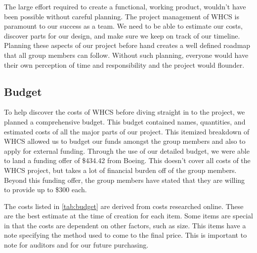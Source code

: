 The large effort required to create a functional, working product, wouldn't
have been possible without careful planning. The project management of WHCS is
paramount to our success as a team. We need to be able to estimate our costs,
discover parts for our design, and make sure we keep on track of our timeline.
Planning these aspects of our project before hand creates a well defined
roadmap that all group members can follow. Without such planning, everyone
would have their own perception of time and responsibility and the project
would flounder.

\subsection{Budget}
To help discover the costs of WHCS before diving straight in to the project, we
planned a comprehensive budget. This budget contained names, quantities, and
estimated costs of all the major parts of our project. This itemized breakdown
of WHCS allowed us to budget our funds amongst the group members and also to
apply for external funding. Through the use of our detailed budget, we were
able to land a funding offer of \$434.42 from Boeing. This doesn't cover all
costs of the WHCS project, but takes a lot of financial burden off of the group
members. Beyond this funding offer, the group members have stated that they are
willing to provide up to \$300 each.

The costs listed in \autoref{tab:budget} are derived from costs researched
online. These are the best estimate at the time of creation for each item. Some
items are special in that the costs are dependent on other factors, such as
size. This items have a note specifying the method used to come to the final
price. This is important to note for auditors and for our future purchasing.

